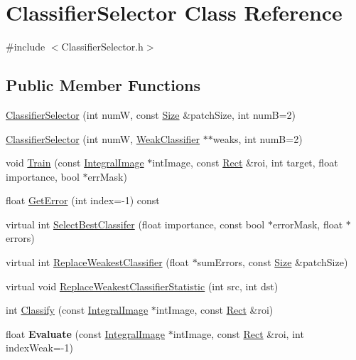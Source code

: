 \hypertarget{classClassifierSelector}{}\section{Classifier\+Selector Class Reference}
\label{classClassifierSelector}


{\ttfamily \#include $<$Classifier\+Selector.\+h$>$}

\subsection*{Public Member Functions}
\begin{DoxyCompactItemize}
\item 
\hyperlink{classClassifierSelector_a21eb14f2ad33c62dd94fdfced0d8d9e6}{Classifier\+Selector} (int num\+W, const \hyperlink{classSize}{Size} \&patch\+Size, int num\+B=2)
\item 
\hyperlink{classClassifierSelector_a6bf8094c2c8afde715ab75e729efa4af}{Classifier\+Selector} (int num\+W, \hyperlink{classWeakClassifier}{Weak\+Classifier} $\ast$$\ast$weaks, int num\+B=2)
\item 
void \hyperlink{classClassifierSelector_afd948f69609ddac9d1effb6b899c4d08}{Train} (const \hyperlink{classIntegralImage}{Integral\+Image} $\ast$int\+Image, const \hyperlink{classRect}{Rect} \&roi, int target, float importance, bool $\ast$err\+Mask)
\item 
float \hyperlink{classClassifierSelector_ac7f854deb91854b56f24660b77e702ed}{Get\+Error} (int index=-\/1) const 
\item 
virtual int \hyperlink{classClassifierSelector_aa146f727c4d0d212935885bec3c63ed8}{Select\+Best\+Classifer} (float importance, const bool $\ast$error\+Mask, float $\ast$errors)
\item 
virtual int \hyperlink{classClassifierSelector_a027e9055c2ed7b27493e208d2ddd5cc9}{Replace\+Weakest\+Classifier} (float $\ast$sum\+Errors, const \hyperlink{classSize}{Size} \&patch\+Size)
\item 
virtual void \hyperlink{classClassifierSelector_a07a0717148abf071a4bc3785b72bb3d3}{Replace\+Weakest\+Classifier\+Statistic} (int src, int dst)
\item 
int \hyperlink{classClassifierSelector_acaca168ce5bb47624157c7559cc56108}{Classify} (const \hyperlink{classIntegralImage}{Integral\+Image} $\ast$int\+Image, const \hyperlink{classRect}{Rect} \&roi)
\item 
\hypertarget{classClassifierSelector_a580884e2c9069f9377c1ff49373c22ff}{}float {\bfseries Evaluate} (const \hyperlink{classIntegralImage}{Integral\+Image} $\ast$int\+Image, const \hyperlink{classRect}{Rect} \&roi, int index\+Weak=-\/1)\label{classClassifierSelector_a580884e2c9069f9377c1ff49373c22ff}


\end{DoxyCompactItemize}
